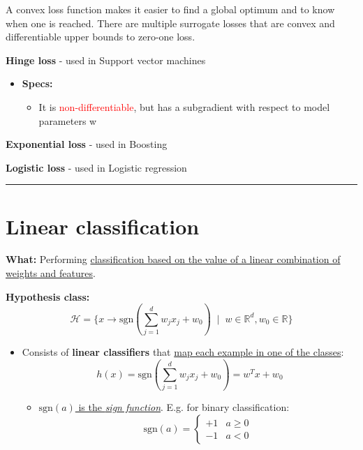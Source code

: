 \documentclass[12pt, a4paper]{article}
\let\stdsection\section
\renewcommand\section{\newpage\stdsection} %
\begin{document}
A convex loss function makes it easier to find a global optimum and to know when one is reached. There are multiple surrogate losses that are convex and differentiable upper bounds to zero-one loss.


\textbf{Hinge loss} - used in Support vector machines

\begin{itemize}
  \item \textbf{Specs:}
  \begin{itemize}
    \item It is \textcolor{red}{non-differentiable}, but has a subgradient with respect to model parameters w
  \end{itemize}
\end{itemize}


\textbf{Exponential loss} - used in Boosting


\textbf{Logistic loss} - used in Logistic regression



\begin{center}\rule{3in}{0.4pt}\end{center}




















\section{Linear classification}\label{linear-classification}

\textbf{What:} Performing \uline{classification based on the value of a linear combination of weights and features}.

\textbf{Hypothesis class:}
$$
\mathcal{H} = \{x \rightarrow \text{sgn}\left(\sum_{j=1}^d w_j x_j + w_0\right) \;\;|\;\; w \in \mathbb{R}^d, w_0 \in \mathbb{R}\}
$$

\begin{itemize}
  \item Consists of \textbf{linear classifiers} that \uline{map each example in one of the classes}:
  $$
  h(x) = \text{sgn}\left(\sum_{j=1}^d w_j x_j + w_0\right) = w^T x + w_0
  $$
  \begin{itemize}
    \item \uline{$\text{sgn}(a)$ is the \textit{sign function}}. E.g. for binary classification:
    $$
    \text{sgn}(a) =
    \begin{cases}
      +1 & a \geq 0 \\
      -1 & a < 0
    \end{cases}
    $$
  \end{itemize}
\end{itemize}
\end{document}
